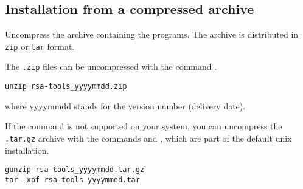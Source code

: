 \documentclass{article}
\begin{document}







\subsection{Installation from a compressed archive}

Uncompress the archive containing the programs. The archive is
distributed in \texttt{zip} or \texttt{tar} format.

The \texttt{.zip} files can be uncompressed with the command
.

\begin{verbatim}
unzip rsa-tools_yyyymmdd.zip
\end{verbatim}
where yyyymmdd stands for the version number (delivery date).

If the  command is not supported on your system, you
can uncompress the \texttt{.tar.gz} archive with the commands
 and , which are part of the default unix
installation.

\begin{verbatim}
gunzip rsa-tools_yyyymmdd.tar.gz
tar -xpf rsa-tools_yyyymmdd.tar
\end{verbatim}
\end{document}
